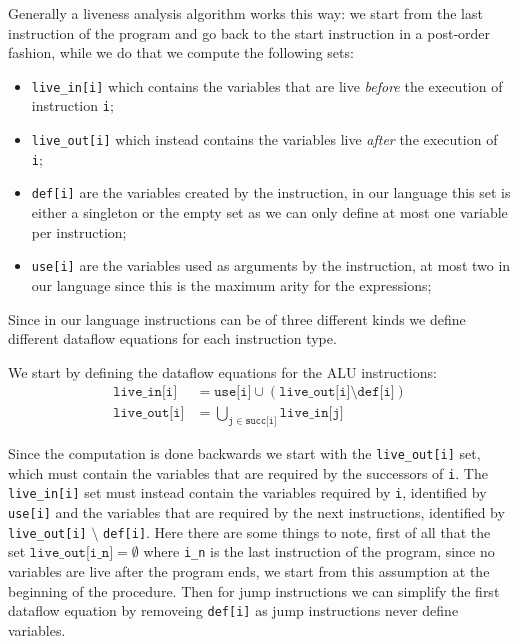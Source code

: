 Generally a liveness analysis algorithm works this way:
we start from the last instruction of the program and go back to the start instruction in a post-order fashion, while we do that we compute the following sets:
\begin{itemize}
  \item \texttt{live\_in[i]} which contains the variables that are live \textit{before} the execution of instruction \texttt i;
  \item \texttt{live\_out[i]} which instead contains the variables live \textit{after} the execution of \texttt i;
  \item \texttt{def[i]} are the variables created by the instruction, in our language this set is either a singleton or the empty set as we can only define at most one variable per instruction;
  \item \texttt{use[i]} are the variables used as arguments by the instruction, at most two in our language since this is the maximum arity for the expressions;
\end{itemize}

Since in our language instructions can be of three different kinds we define different dataflow equations for each instruction type.

We start by defining the dataflow equations for the ALU instructions:
\begin{align*}
  \texttt{live\_in[i]} &= \texttt{use[i]} \cup (\texttt{live\_out[i]} \setminus \texttt{def[i]}) \\
  \texttt{live\_out[i]} &= \bigcup \limits_{\texttt j \in \texttt{succ[i]}} \texttt{live\_in[j]}
\end{align*}

Since the computation is done backwards we start with the \texttt{live\_out[i]} set, which must contain the variables that are required by the successors of \texttt i. The
\texttt{live\_in[i]} set must instead contain the variables required by \texttt i, identified by \texttt{use[i]} and the variables that are required by the next instructions, identified by \texttt{live\_out[i]} $\setminus$ \texttt{def[i]}.
Here there are some things to note, first of all that the set $\texttt{live\_out[i\_n]} = \emptyset$ where \texttt{i\_n} is the last instruction of the program, since no variables are live after the program ends, we start from this assumption at the beginning of the procedure.
Then for jump instructions we can simplify the first dataflow equation by removeing \texttt{def[i]} as jump instructions never define variables.


